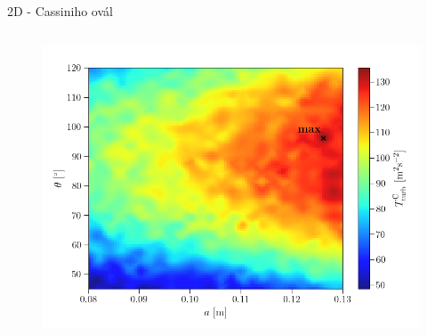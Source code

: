 \documentclass[aspectratio=169,xcolor=dvipsnames]{beamer}
\begin{document}
\begin{frame}{2D - Cassiniho ovál}
	\begin{columns}
		\begin{column}{1\textwidth}
			\begin{figure}
				\includegraphics[width=0.68\linewidth, trim={0 0 0cm 9mm}, clip]{Images/cassini2Dinterpolated.png}		
			\end{figure}
		\end{column}
	\end{columns}	
\end{frame}
\end{document}
